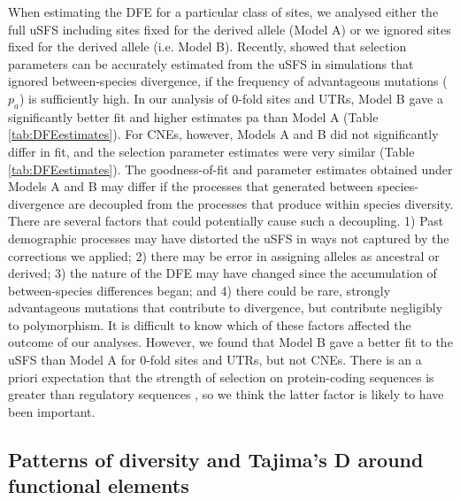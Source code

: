 	When estimating the DFE for a particular class of sites, we analysed either the full uSFS including sites fixed for the derived allele (Model A) or we ignored sites fixed for the derived allele (i.e. Model B). Recently,\cite{RN354} showed that selection parameters can be accurately estimated from the uSFS in simulations that ignored between-species divergence, if the frequency of advantageous mutations ($p_a$) is sufficiently high. In our analysis of 0-fold sites and UTRs, Model B gave a significantly better fit and higher estimates pa than Model A (Table \ref{tab:DFEestimates}). For CNEs, however, Models A and B did not significantly differ in fit, and the selection parameter estimates were very similar (Table \ref{tab:DFEestimates}). The goodness-of-fit and parameter estimates obtained under Models A and B may differ if the processes that generated between species-divergence are decoupled from the processes that produce within species diversity. There are several factors that could potentially cause such a decoupling. 1) Past demographic processes may have distorted the uSFS in ways not captured by the corrections we applied; 2) there may be error in assigning alleles as ancestral or derived; 3) the nature of the DFE may have changed since the accumulation of between-species differences began; and 4) there could be rare, strongly advantageous mutations that contribute to divergence, but contribute negligibly to polymorphism. It is difficult to know which of these factors affected the outcome of our analyses. However, we found that Model B gave a better fit to the uSFS than Model A for 0-fold sites and UTRs, but not CNEs. There is an a priori expectation that the strength of selection on protein-coding sequences is greater than regulatory sequences \cite{RN122}, so we think the latter factor is likely to have been important. 

\subsection{Patterns of diversity and Tajima's D around functional elements}

